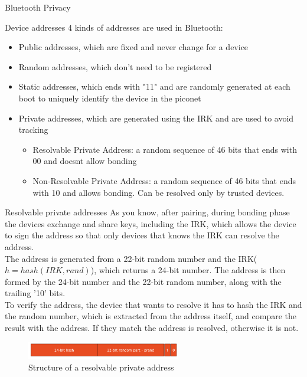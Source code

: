 \begin{section}{Bluetooth Privacy}
  \begin{subsection}{Device addresses}
    4 kinds of addresses are used in Bluetooth:
    \begin{itemize}
      \item Public addresses, which are fixed and never change for a device
      \item Random addresses, which don't need to be registered
      \item Static addresses, which ends with "11" and are randomly generated at each boot to
        uniquely identify the device in the piconet
      \item Private addresses, which are generated using the IRK and are used to avoid tracking
        \begin{itemize}
          \item Resolvable Private Address: a random sequence of 46 bits that ends with 00 and
            doesnt allow bonding
          \item Non-Resolvable Private Address: a random sequence of 46 bits that ends with 10 and
            allows bonding. Can be resolved only by trusted devices.
        \end{itemize}
    \end{itemize}

    \begin{subsubsection}{Resolvable private addresses}
      As you know, after pairing, during bonding phase the devices exchange and share keys,
      including the IRK, which allows the device to sign the address so that only devices that knows
      the IRK can resolve the address.\\

      The address is generated from a 22-bit random number and the IRK($h=hash(IRK,rand)$), which
      returns a 24-bit number. The address is then formed by the 24-bit number and the 22-bit
      random number, along with the trailing '10' bits.\\

      To verify the address, the device that wants to resolve it has to hash the IRK and the random
      number, which is extracted from the address itself, and compare the result with the address.
      If they match the address is resolved, otherwise it is not.\\

      \begin{figure}[H]
        \centering
        \includegraphics[width=0.6\textwidth]{img/wireless/resolvable private address.png}
        \caption{Structure of a resolvable private address}
      \end{figure}

    \end{subsubsection}
  \end{subsection}
\end{section}

